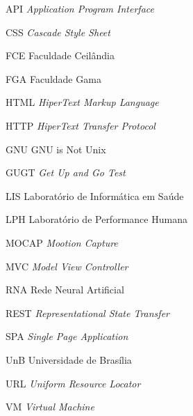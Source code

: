 \begin{siglas}
	\item[API] \emph{Application Program Interface}
	\item[CSS] \emph{Cascade Style Sheet}
	\item[FCE] Faculdade Ceilândia 
	\item[FGA] Faculdade Gama
	\item[HTML] \emph{HiperText Markup Language}
	\item[HTTP] \emph{HiperText Transfer Protocol}
	\item[GNU] GNU is Not Unix
	\item[GUGT] \emph{Get Up and Go Test}
	\item[LIS] Laboratório de Informática em Saúde
	\item[LPH] Laboratório de Performance Humana
	\item[MOCAP] \emph{Mootion Capture}
	\item[MVC] \emph{Model View Controller}
	\item[RNA] Rede Neural Artificial
	\item[REST] \emph{Representational State Transfer}
	\item[SPA] \emph{Single Page Application}
	\item[UnB] Universidade de Brasília
	\item[URL] \emph{Uniform Resource Locator}
	\item[VM] \emph{Virtual Machine}


\end{siglas}
